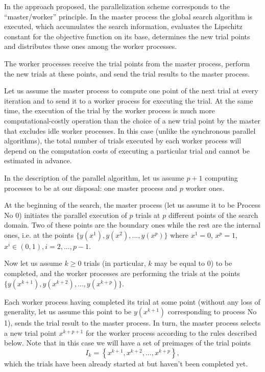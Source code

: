 \documentclass{svproc}
\begin{document}
In the approach proposed, the parallelization scheme corresponds to the ``master/worker'' principle.
In the master process the global search algorithm is executed, which accumulates the search information, evaluates the Lipschitz constant for the objective function on its base, determines the new trial points and distributes these ones among the worker processes. 

The worker processes receive the trial points from the master process, perform the new trials at these points, and send the trial results to the master process. 

Let us assume the master process to compute one point of the next trial at every iteration and to send it to a worker process for executing the trial. 
At the same time, the execution of the trial by the worker process is much more computational-costly operation than the choice of a new trial point by the master that excludes idle worker processes. 
In this case (unlike the synchronous parallel algorithms), the total number of trials executed by each worker process will depend on the computation costs of executing a particular trial and cannot be estimated in advance.

In the description of the parallel algorithm, let us assume $p+1$ computing processes to be at our disposal: one master process and $p$ worker ones.
 
At the beginning of the search, the master process (let us assume it to be Process No 0) initiates the parallel execution of $p$ trials at $p$ different points of the search domain. 
Two of these points are the boundary ones while the rest are the internal ones, i.e. at the points $\{y(x^1), y(x^2), ...,y(x^p)\}$ where 
$x^1 = 0$, $x^p = 1$, $x^i\in(0,1), i=2,..., p-1$.

Now let us assume $k\geq 0$ trials (in particular, $k$ may be equal to 0) to be completed, and the worker processes are performing the trials at the points $\{y(x^{k+1}), y(x^{k+2}), ...,y(x^{k+p})\}$. 

Each worker process having completed its trial at some point (without any loss of generality, let us assume this point to be $y(x^{k+1})$ corresponding to process No 1), sends the trial result to the master process. 
In turn, the master process selects a new trial point $x^{k+p+1}$ for the worker process according to the rules described below.
Note that in this case we will have a set of preimages of the trial points
\[
I_k = \left\{ x^{k+1},x^{k+2},...,x^{k+p} \right\},
\]
which the trials have been already started at but haven't been completed yet.
\end{document}
